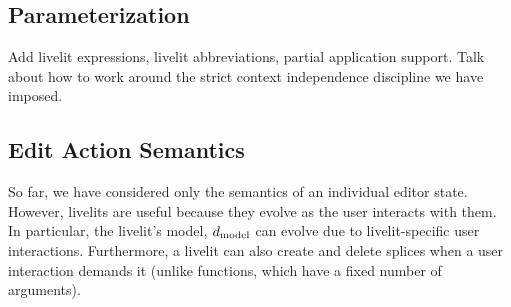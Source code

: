 \subsection{Parameterization}

Add livelit expressions, livelit abbreviations, 
partial application support. Talk about how to work around the strict context
independence discipline we have imposed.

\subsection{Edit Action Semantics}
So far, we have considered only the semantics of an individual editor state.
However, livelits are useful because they evolve as the user interacts
with them. In particular, the livelit's model, $d_\text{model}$ can evolve
due to livelit-specific user interactions. Furthermore, a livelit can also 
create and delete splices when a user interaction demands it (unlike functions, which have a fixed 
number of arguments).

